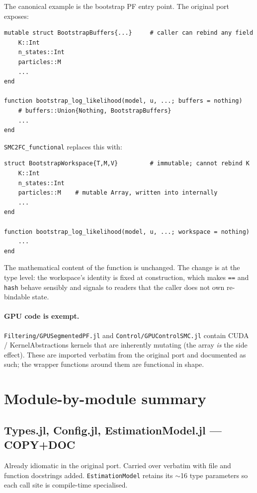 \documentclass[11pt,a4paper]{article}
\begin{document}
The canonical example is the bootstrap PF entry point. The original port
exposes:

\begin{lstlisting}
mutable struct BootstrapBuffers{...}     # caller can rebind any field
    K::Int
    n_states::Int
    particles::M
    ...
end

function bootstrap_log_likelihood(model, u, ...; buffers = nothing)
    # buffers::Union{Nothing, BootstrapBuffers}
    ...
end
\end{lstlisting}

\noindent \texttt{SMC2FC\_functional} replaces this with:

\begin{lstlisting}
struct BootstrapWorkspace{T,M,V}         # immutable; cannot rebind K
    K::Int
    n_states::Int
    particles::M    # mutable Array, written into internally
    ...
end

function bootstrap_log_likelihood(model, u, ...; workspace = nothing)
    ...
end
\end{lstlisting}

The mathematical content of the function is unchanged. The change is at
the type level: the workspace's identity is fixed at construction, which
makes \texttt{==} and \texttt{hash} behave sensibly and signals to readers
that the caller does not own re-bindable state.

\paragraph{GPU code is exempt.}
\texttt{Filtering/GPUSegmentedPF.jl} and \texttt{Control/GPUControlSMC.jl}
contain CUDA / KernelAbstractions kernels that are inherently mutating
(the array \emph{is} the side effect). These are imported verbatim from
the original port and documented as such; the wrapper functions around
them are functional in shape.

\section{Module-by-module summary}

\subsection{Types.jl, Config.jl, EstimationModel.jl --- COPY+DOC}
Already idiomatic in the original port. Carried over verbatim with file
and function docstrings added. \texttt{EstimationModel} retains its
$\sim$16 type parameters so each call site is compile-time specialised.
\end{document}
